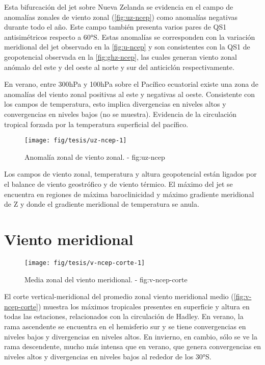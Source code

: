 \documentclass[spanish,a4paper,12p]{book}
\begin{document}
Esta bifurcación del jet sobre Nueva Zelanda se evidencia en el campo de
anomalías zonales de viento zonal (\autoref{fig:uz-ncep}) como anomalías
negativas durante todo el año. Este campo también presenta varios pares
de QS1 antisimétricos respecto a 60°S. Estas anomalías se corresponden
con la variación meridional del jet observado en la \autoref{fig:u-ncep}
y son consistentes con la QS1 de geopotencial observada en la
\autoref{fig:ghz-ncep}, las cuales generan viento zonal anómalo del este
y del oeste al norte y sur del anticiclón respectivamente.

En verano, entre 300hPa y 100hPa sobre el Pacífico ecuatorial existe una
zona de anomalías del viento zonal positivas al este y negativas al
oeste. Consistente con los campos de temperatura, esto implica
divergencias en niveles altos y convergencias en niveles bajos (no se
muestra). Evidencia de la circulación tropical forzada por la
temperatura superficial del pacífico.

\begin{landscape}\begin{figure}

{\centering \texttt{[image: fig/tesis/uz-ncep-1]} 

}

\caption{Anomalía zonal de viento zonal. - fig:uz-ncep}\label{fig:uz-ncep}
\end{figure}
\end{landscape}

Los campos de viento zonal, temperatura y altura geopotencial están
ligados por el balance de viento geostrófico y de viento térmico. El
máximo del jet se encuentra en regiones de máxima baroclinicidad y
máximo gradiente meridional de Z y donde el gradiente meridional de
temperatura se anula.

\section{Viento meridional}\label{viento-meridional}

\begin{figure}

{\centering \texttt{[image: fig/tesis/v-ncep-corte-1]} 

}

\caption{Media zonal del viento meridional. - fig:v-ncep-corte}\label{fig:v-ncep-corte}
\end{figure}

El corte vertical-meridional del promedio zonal viento meridional medio
(\autoref{fig:v-ncep-corte}) muestra los máximos tropicales presentes en
superficie y altura en todas las estaciones, relacionados con la
circulación de Hadley. En verano, la rama ascendente se encuentra en el
hemisferio sur y se tiene convergencias en niveles bajos y divergencias
en niveles altos. En invierno, en cambio, sólo se ve la rama
descendente, mucho más intensa que en verano, que genera convergencias
en niveles altos y divergencias en niveles bajos al rededor de los 30°S.
\end{document}
